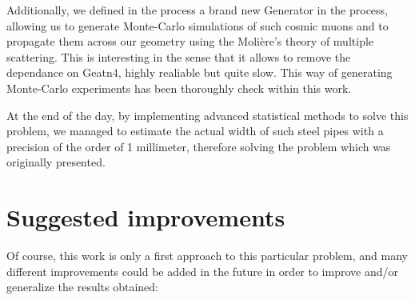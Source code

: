 \documentclass[a4paper, 11pt]{report}
\begin{document}
Additionally, we defined in the process a brand new Generator in the process, allowing us to generate Monte-Carlo simulations of such cosmic muons and to propagate them across our geometry using the Moli\`ere's theory of multiple scattering. This is interesting in the sense that it allows to remove the dependance on Geatn4, highly realiable but quite slow. This way of generating Monte-Carlo experiments has been thoroughly check within this work. 

At the end of the day, by implementing advanced statistical methods to solve this problem, we managed to estimate the actual width of such steel pipes with a precision of the order of 1 millimeter, therefore solving the problem which was originally presented.

\section{Suggested improvements}

Of course, this work is only a first approach to this particular problem, and many different improvements could be added in the future in order to improve and/or generalize the results obtained:
\end{document}
